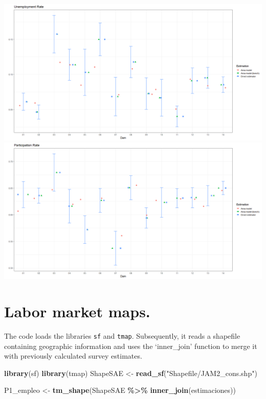 \documentclass[
  12pt,
]{book}
\newenvironment{Shaded}{\begin{snugshade}}{\end{snugshade}}
\newcommand{\FunctionTok}[1]{\textcolor[rgb]{0.13,0.29,0.53}{\textbf{#1}}}
\newcommand{\NormalTok}[1]{#1}
\newcommand{\OtherTok}[1]{\textcolor[rgb]{0.56,0.35,0.01}{#1}}
\newcommand{\SpecialCharTok}[1]{\textcolor[rgb]{0.81,0.36,0.00}{\textbf{#1}}}
\newcommand{\StringTok}[1]{\textcolor[rgb]{0.31,0.60,0.02}{#1}}
\begin{document}
\includegraphics{Recursos/05_Empleo/16_plot_uni_TD.png}
\includegraphics{Recursos/05_Empleo/16_plot_uni_TP.png}

\hypertarget{labor-market-maps.}{%
\section{Labor market maps.}\label{labor-market-maps.}}

The code loads the libraries \texttt{sf} and \texttt{tmap}. Subsequently, it reads a shapefile containing geographic information and uses the `inner\_join' function to merge it with previously calculated survey estimates.

\begin{Shaded}
\begin{Highlighting}[]
\FunctionTok{library}\NormalTok{(sf)}
\FunctionTok{library}\NormalTok{(tmap)}
\NormalTok{ShapeSAE }\OtherTok{\textless{}{-}} \FunctionTok{read\_sf}\NormalTok{(}\StringTok{"Shapefile/JAM2\_cons.shp"}\NormalTok{)}

\NormalTok{P1\_empleo }\OtherTok{\textless{}{-}} \FunctionTok{tm\_shape}\NormalTok{(ShapeSAE }\SpecialCharTok{\%\textgreater{}\%}
                           \FunctionTok{inner\_join}\NormalTok{(estimaciones))}
\end{Highlighting}
\end{Shaded}
\end{document}
